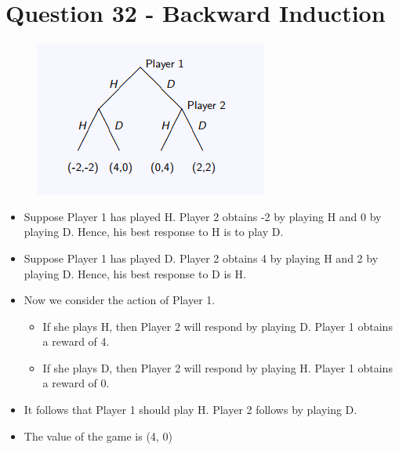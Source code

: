 \documentclass[]{report}
\begin{document}
	\section*{Question 32 - Backward Induction}
	
	\begin{figure}[h!]
\centering
\includegraphics[width=0.5\linewidth]{Q32}
\caption{}
\label{fig:q32}
\end{figure}

\begin{itemize}
	\item Suppose Player 1 has played H. Player 2 obtains -2 by playing H
	and 0 by playing D. Hence, his best response to H is to play D.
\item Suppose Player 1 has played D. Player 2 obtains 4 by playing H
	and 2 by playing D. Hence, his best response to D is H.
\item Now we consider the action of Player 1.
\begin{itemize}
	\item If she plays H, then Player 2 will respond by playing D. Player 1
	obtains a reward of 4.
	\item If she plays D, then Player 2 will respond by playing H. Player 1
	obtains a reward of 0.
\end{itemize}

	\item It follows that Player 1 should play H. Player 2 follows by playing
	D.
	\item	The value of the game is (4, 0)
\end{itemize}
\end{document}
